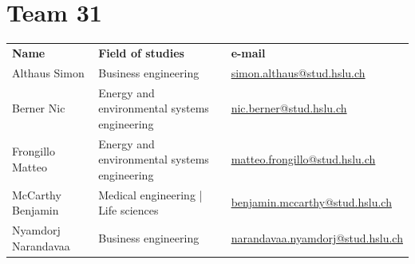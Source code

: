 \documentclass{article}
\begin{document}
\newpage
\section*{Team 31}
\renewcommand{\arraystretch}{1.5}
\begin{tabular}{@{}p{}p{}p{}@{}}
\textbf{Name} & \textbf{Field of studies} & \textbf{e-mail} \\
Althaus Simon & Business engineering & \href{mailto:simon.althaus@stud.hslu.ch}{simon.althaus@stud.hslu.ch} \\
Berner Nic & Energy and environmental systems engineering & \href{mailto:nic.berner@stud.hslu.ch}{nic.berner@stud.hslu.ch} \\
Frongillo Matteo & Energy and environmental systems engineering & \href{mailto:matteo.frongillo@stud.hslu.ch}{matteo.frongillo@stud.hslu.ch} \\
McCarthy Benjamin & Medical engineering | Life sciences & \href{mailto:benjamin.mccarthy@stud.hslu.ch}{benjamin.mccarthy@stud.hslu.ch} \\
Nyamdorj Narandavaa & Business engineering & \href{mailto:narandavaa.nyamdorj@stud.hslu.ch}{narandavaa.nyamdorj@stud.hslu.ch} \\
\end{tabular}
\end{document}
